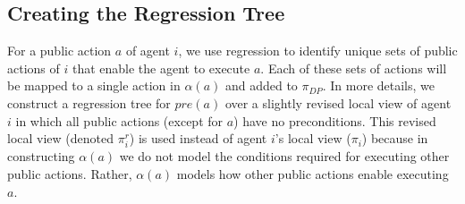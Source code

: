 \documentclass[letterpaper]{article}
\newcommand{\pre}{\textit{pre}}
\theoremstyle{definition}
\begin{document}







\subsection{Creating the Regression Tree}


For a public action $a$ of agent $i$, we use regression to identify unique sets of public actions of $i$ that enable the agent to execute $a$. Each of these sets of actions will be mapped to a single action in $\alpha(a)$ and added to $\pi_{DP}$. 
In more details, we construct a regression tree for $\pre(a)$ over a slightly revised local view of agent $i$ in which all public actions (except for $a$) have no preconditions. This revised local view (denoted $\pi_i^r$) is used instead of agent $i$'s local view ($\pi_i$) because in constructing $\alpha(a)$ we do not model the conditions required for executing other public actions. Rather, $\alpha(a)$ models how other public actions enable executing $a$. 
\end{document}

